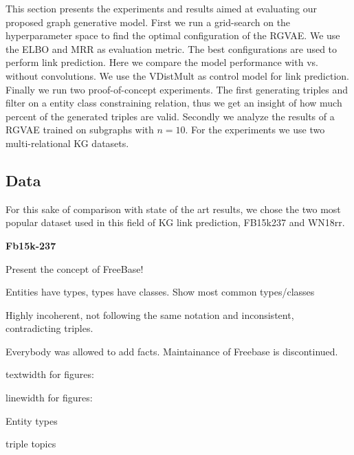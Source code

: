 
This section presents the experiments and results aimed at evaluating our proposed graph generative model. First we run a grid-search on the hyperparameter space to find the optimal configuration of the RGVAE. We use the ELBO and MRR as evaluation metric. The best configurations are used to perform link prediction. Here we compare the model performance with vs. without convolutions. We use the VDistMult as control model for link prediction. Finally we run two proof-of-concept experiments. The first generating triples and filter on a entity class constraining relation, thus we get an insight of how much percent of the generated triples are valid. Secondly we analyze the results of a RGVAE trained on subgraphs with $n=10$. For the experiments we use two multi-relational KG datasets.



\subsection{Data}
\label{ssec5:data}
For this sake of comparison with state of the art results, we chose the two most popular dataset used in this field of KG link prediction, FB15k237 and WN18rr.


\textbf{Fb15k-237}

Present the concept of FreeBase!

Entities have types, types have classes. Show most common types/classes

Highly incoherent, not following the same notation and inconsistent, contradicting triples.

Everybody was allowed to add facts. Maintainance of Freebase is discontinued. 

textwidth for figures:
\prntlen{\textwidth}

linewidth for figures:
\prntlen{\linewidth}

Entity types

triple topics


